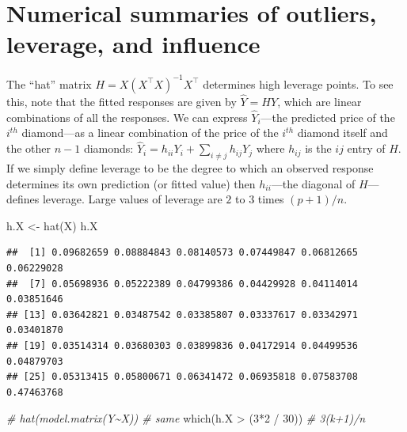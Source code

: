 \documentclass[
]{book}
\newenvironment{Shaded}{\begin{snugshade}}{\end{snugshade}}
\newcommand{\CommentTok}[1]{\textcolor[rgb]{0.56,0.35,0.01}{\textit{#1}}}
\newcommand{\DecValTok}[1]{\textcolor[rgb]{0.00,0.00,0.81}{#1}}
\newcommand{\FunctionTok}[1]{\textcolor[rgb]{0.00,0.00,0.00}{#1}}
\newcommand{\NormalTok}[1]{#1}
\newcommand{\OtherTok}[1]{\textcolor[rgb]{0.56,0.35,0.01}{#1}}
\newcommand{\SpecialCharTok}[1]{\textcolor[rgb]{0.00,0.00,0.00}{#1}}
\begin{document}
\hypertarget{numerical-summaries-of-outliers-leverage-and-influence}{%
\section{Numerical summaries of outliers, leverage, and influence}\label{numerical-summaries-of-outliers-leverage-and-influence}}

The ``hat'' matrix \(H = X(X^\top X)^{-1}X^\top\) determines high leverage points. To see this, note that the fitted responses are given by \(\hat Y = H Y\), which are linear combinations of all the responses. We can express \(\hat Y_i\)---the predicted price of the \(i^{th}\) diamond---as a linear combination of the price of the \(i^{th}\) diamond itself and the other \(n-1\) diamonds: \(\hat Y_i = h_{ii}Y_i + \sum_{i\ne j} h_{ij}Y_j\) where \(h_{ij}\) is the \(ij\) entry of \(H\). If we simply define leverage to be the degree to which an observed response determines its own prediction (or fitted value) then \(h_{ii}\)---the diagonal of \(H\)---defines leverage. Large values of leverage are \(2\) to \(3\) times \((p+1)/n\).

\begin{Shaded}
\begin{Highlighting}[]
\NormalTok{h.X }\OtherTok{\textless{}{-}} \FunctionTok{hat}\NormalTok{(X)}
\NormalTok{h.X}
\end{Highlighting}
\end{Shaded}

\begin{verbatim}
##  [1] 0.09682659 0.08884843 0.08140573 0.07449847 0.06812665 0.06229028
##  [7] 0.05698936 0.05222389 0.04799386 0.04429928 0.04114014 0.03851646
## [13] 0.03642821 0.03487542 0.03385807 0.03337617 0.03342971 0.03401870
## [19] 0.03514314 0.03680303 0.03899836 0.04172914 0.04499536 0.04879703
## [25] 0.05313415 0.05800671 0.06341472 0.06935818 0.07583708 0.47463768
\end{verbatim}

\begin{Shaded}
\begin{Highlighting}[]
\CommentTok{\# hat(model.matrix(Y\textasciitilde{}X))   \# same}
\FunctionTok{which}\NormalTok{(h.X }\SpecialCharTok{\textgreater{}}\NormalTok{ (}\DecValTok{3}\SpecialCharTok{*}\DecValTok{2} \SpecialCharTok{/} \DecValTok{30}\NormalTok{))   }\CommentTok{\# 3(k+1)/n}
\end{Highlighting}
\end{Shaded}
\end{document}
